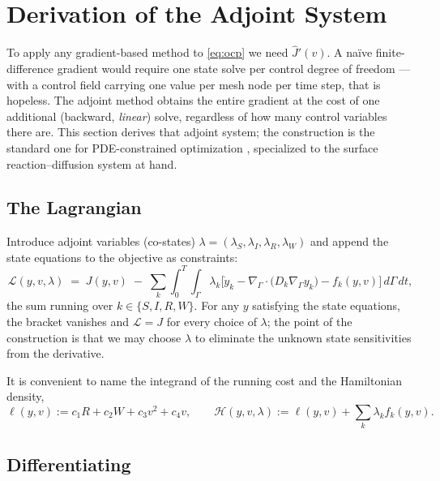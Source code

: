 \documentclass[11pt]{article}
\newcommand{\Grad}{\nabla_\Gamma}
\newcommand{\Div}{\nabla_\Gamma\cdot}
\newcommand{\Ham}{\mathcal{H}}
\newcommand{\Lag}{\mathcal{L}}
\begin{document}
\section{Derivation of the Adjoint System}
\label{sec:adjoint-derivation}

To apply any gradient-based method to \eqref{eq:ocp} we need $\hat J'(v)$. A na\"ive finite-difference gradient would require one state solve per control degree of freedom --- with a control field carrying one value per mesh node per time step, that is hopeless. The adjoint method obtains the entire gradient at the cost of one additional (backward, \emph{linear}) solve, regardless of how many control variables there are. This section derives that adjoint system; the construction is the standard one for PDE-constrained optimization \citep{Hinze2009}, specialized to the surface reaction--diffusion system at hand.

\subsection{The Lagrangian}

Introduce adjoint variables (co-states) $\lambda = (\lambda_S,\lambda_I,\lambda_R,\lambda_W)$ and append the state equations to the objective as constraints:
\begin{equation}
\Lag(y,v,\lambda) \;=\; J(y,v) \;-\; \sum_{k}\int_0^T\!\!\int_\Gamma \lambda_k\Big[\dot y_k - \Div\big(D_k\Grad y_k\big) - f_k(y,v)\Big]\,d\Gamma\,dt,
\label{eq:lagrangian}
\end{equation}
the sum running over $k\in\{S,I,R,W\}$. For any $y$ satisfying the state equations, the bracket vanishes and $\Lag = J$ for every choice of $\lambda$; the point of the construction is that we may choose $\lambda$ to eliminate the unknown state sensitivities from the derivative.

It is convenient to name the integrand of the running cost and the Hamiltonian density,
\begin{equation}
\ell(y,v) := c_1 R + c_2 W + c_3 v^2 + c_4 v, \qquad
\Ham(y,v,\lambda) := \ell(y,v) + \sum_k \lambda_k f_k(y,v).
\label{eq:hamiltonian}
\end{equation}

\subsection{Differentiating}
\end{document}
